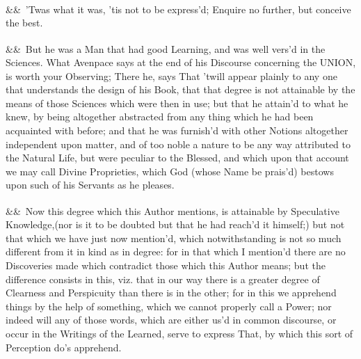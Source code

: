 \documentclass[12pt]{article}
\newcommand{\para}[1][]{\par\noindent\ifx&#1&\else\textsuperscript{\footnotesize #1}~\fi}
\begin{document}
\para 'Twas what it was, 'tis not to be express'd; Enquire no further, but conceive the best.

\para But he was a Man that had good Learning, and was well vers'd in the Sciences. What Avenpace says at the end of his Discourse concerning the UNION, is worth your Observing; There he, says That 'twill appear plainly to any one that understands the design of his Book, that that degree is not attainable by the means of those Sciences which were then in use; but that he attain'd to what he knew, by being altogether abstracted from any thing which he had been acquainted with before; and that he was furnish'd with other Notions altogether independent upon matter, and of too noble a nature to be any way attributed to the Natural Life, but were peculiar to the Blessed, and which upon that account we may call Divine Proprieties, which God (whose Name be prais'd) bestows upon such of his Servants as he pleases.

\para Now this degree which this Author mentions, is attainable by Speculative Knowledge,(nor is it to be doubted but that he had reach'd it himself;) but not that which we have just now mention'd, which notwithstanding is not so much different from it in kind as in degree: for in that which I mention'd there are no Discoveries made which contradict those which this Author means; but the difference consists in this, viz. that in our way there is a greater degree of Clearness and Perspicuity than there is in the other; for in this we apprehend things by the help of something, which we cannot properly call a Power; nor indeed will any of those words, which are either us'd in common discourse, or occur in the Writings of the Learned, serve to express That, by which this sort of Perception do's apprehend.
\end{document}
